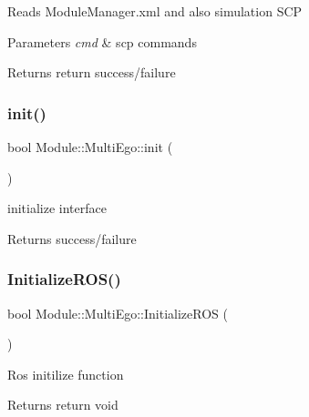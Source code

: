Reads Module\+Manager.\+xml and also simulation S\+CP 
\begin{DoxyParams}{Parameters}
{\em cmd} & scp commands \\
\hline
\end{DoxyParams}
\begin{DoxyReturn}{Returns}
return success/failure 
\end{DoxyReturn}
\mbox{\label{classModule_1_1MultiEgo_aa91dec5952b561546ad63bf14517ecc7}} 
\subsubsection{\texorpdfstring{init()}{init()}}
{\footnotesize\ttfamily bool Module\+::\+Multi\+Ego\+::init (\begin{DoxyParamCaption}{ }\end{DoxyParamCaption})\hspace{0.3cm}{\ttfamily [virtual]}}

initialize interface \begin{DoxyReturn}{Returns}
success/failure 
\end{DoxyReturn}
\mbox{\label{classModule_1_1MultiEgo_a0f37a737beb2b3be39b4ae081335f61e}} 
\subsubsection{\texorpdfstring{Initialize\+R\+O\+S()}{InitializeROS()}}
{\footnotesize\ttfamily bool Module\+::\+Multi\+Ego\+::\+Initialize\+R\+OS (\begin{DoxyParamCaption}{ }\end{DoxyParamCaption})}

Ros initilize function \begin{DoxyReturn}{Returns}
return void 
\end{DoxyReturn}
\mbox{\label{classModule_1_1MultiEgo_a51c4d1e54c327a2c96d2ae60f1d6d1b8}} 
